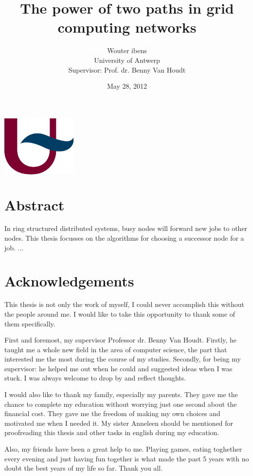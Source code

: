 \documentclass[10pt,a4paper]{article}
\author{Wouter ibens \\ University of Antwerp \\ Supervisor: Prof. dr. Benny Van Houdt}
\title{The power of two paths in grid computing networks}
\date{May 28, 2012}
\begin{document}
\maketitle
\thispagestyle{empty}
\vspace{34em}
\begin{center}
\includegraphics[scale=1.0]{resources/ua.pdf}
\end{center}
\newpage

\section*{Abstract}
In ring structured distributed systems, busy nodes will forward new jobs to other nodes. This thesis focusses on the algorithms for choosing a successor node for a job. ...

\newpage

\section*{Acknowledgements}
This thesis is not only the work of myself, I could never accomplish this without the people around me. I would like to take this opportunity to thank some of them specifically.

First and foremost, my supervisor Professor dr. Benny Van Houdt. Firstly, he taught me a whole new field in the area of computer science, the part that interested me the most during the course of my studies. Secondly, for being my supervisor: he helped me out when he could and suggested ideas when I was stuck. I was always welcome to drop by and reflect thoughts.

I would also like to thank my family, especially my parents. They gave me the chance to complete my education without worrying just one second about the financial cost. They gave me the freedom of making my own choices and motivated me when I needed it. My sister Anneleen should be mentioned for proofreading this thesis and other tasks in english during my education.

Also, my friends have been a great help to me. Playing games, eating toghether every evening and just having fun together is what made the past 5 years with no doubt the best years of my life so far. Thank you all.
\end{document}
